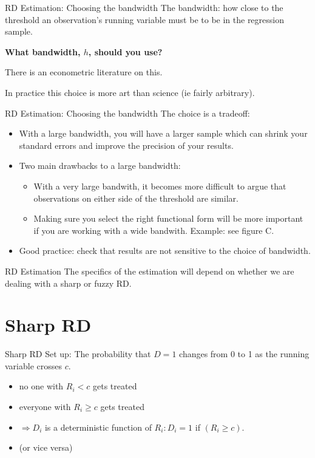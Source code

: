 \documentclass[
  ignorenonframetext,
]{beamer}
\begin{document}
\begin{frame}{RD Estimation: Choosing the bandwidth}
\protect\hypertarget{rd-estimation-choosing-the-bandwidth}{}
The bandwidth: how close to the threshold an observation's running
variable must be to be in the regression sample.

\textbf{What bandwidth, \(h\), should you use?}

There is an econometric literature on this.

In practice this choice is more art than science (ie fairly arbitrary).
\end{frame}

\begin{frame}{RD Estimation: Choosing the bandwidth}
\protect\hypertarget{rd-estimation-choosing-the-bandwidth-1}{}
The choice is a tradeoff:

\begin{itemize}
\item
  With a large bandwidth, you will have a larger sample which can shrink
  your standard errors and improve the precision of your results.
\item
  Two main drawbacks to a large bandwidth:

  \begin{itemize}
  \item
    With a very large bandwith, it becomes more difficult to argue that
    observations on either side of the threshold are similar.
  \item
    Making sure you select the right functional form will be more
    important if you are working with a wide bandwith. Example: see
    figure C.
  \end{itemize}
\item
  Good practice: check that results are not sensitive to the choice of
  bandwidth.
\end{itemize}
\end{frame}

\begin{frame}{RD Estimation}
\protect\hypertarget{rd-estimation-1}{}
The specifics of the estimation will depend on whether we are dealing
with a sharp or fuzzy RD.
\end{frame}

\hypertarget{sharp-rd}{%
\section{Sharp RD}\label{sharp-rd}}

\begin{frame}{Sharp RD Set up:}
\protect\hypertarget{sharp-rd-set-up}{}
The probability that \(D=1\) changes from 0 to 1 as the running variable
crosses \(c\).

\begin{itemize}
\item
  no one with \(R_i<c\) gets treated
\item
  everyone with \(R_i\geq c\) gets treated
\item
  \(\Rightarrow D_i\) is a deterministic function of \(R_i: D_i=1\) if
  \((R_i\geq c)\).
\item
  (or vice versa)
\end{itemize}
\end{frame}
\end{document}
